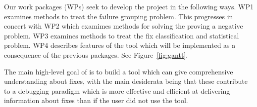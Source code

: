 Our \wptotal{} work packages (WPs) seek to develop the project in the following ways. WP1 examines methods to treat the failure grouping problem. This progresses in concert with WP2 which examimes methods for solving the proving a negative problem. WP3 examines methods to treat the fix classification and statistical problem.  WP4 describes features of the tool which will be implemented as a consequence of the previous packages. 
See Figure~\ref{fig:gantt}.

The main high-level goal of \project{} is to build a  tool which can give comprehensive understanding about fixes, with the main desiderata being that these contribute to a debugging paradigm which is more effective and efficient at delivering information about fixes than if the user did not use the tool.  

